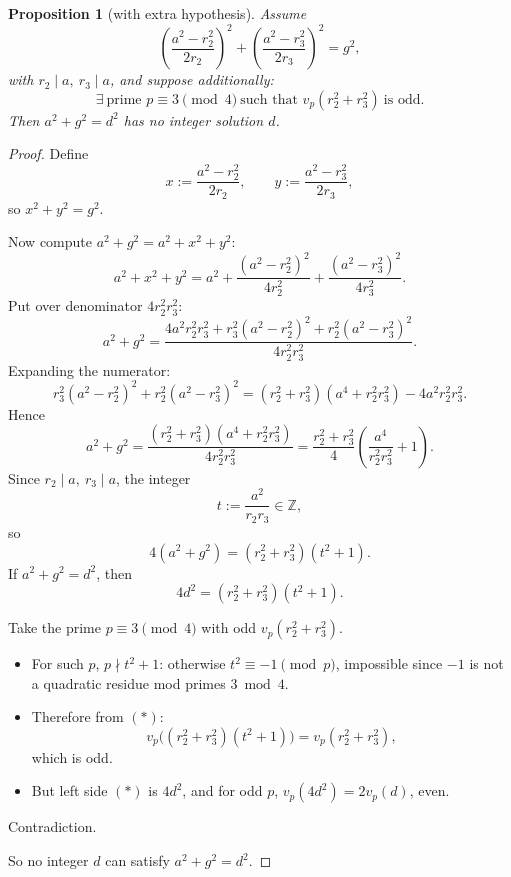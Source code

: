 \documentclass[11pt]{article}
\newtheorem{proposition}{Proposition}
\begin{document}
\begin{proposition}[with extra hypothesis]
Assume
\[
\left(\frac{a^{2}-r_{2}^{2}}{2r_{2}}\right)^{2}
+
\left(\frac{a^{2}-r_{3}^{2}}{2r_{3}}\right)^{2}
=
g^{2},
\]
with \(r_2\mid a,\ r_3\mid a\), and suppose additionally:
\[
\exists\ \text{prime }p\equiv 3\pmod 4\ \text{such that }v_p(r_2^2+r_3^2)\ \text{is odd}.
\]
Then \(a^2+g^2=d^2\) has no integer solution \(d\).
\end{proposition}

\begin{proof}
Define
\[
x:=\frac{a^2-r_2^2}{2r_2},\qquad
y:=\frac{a^2-r_3^2}{2r_3},
\]
so \(x^2+y^2=g^2\).

Now compute \(a^2+g^2=a^2+x^2+y^2\):
\[
a^2+x^2+y^2
=
a^2+\frac{(a^2-r_2^2)^2}{4r_2^2}+\frac{(a^2-r_3^2)^2}{4r_3^2}.
\]
Put over denominator \(4r_2^2r_3^2\):
\[
a^2+g^2
=
\frac{
4a^2r_2^2r_3^2+r_3^2(a^2-r_2^2)^2+r_2^2(a^2-r_3^2)^2
}{
4r_2^2r_3^2
}.
\]
Expanding the numerator:
\[
r_3^2(a^2-r_2^2)^2+r_2^2(a^2-r_3^2)^2
=
(r_2^2+r_3^2)(a^4+r_2^2r_3^2)-4a^2r_2^2r_3^2.
\]
Hence
\[
a^2+g^2
=
\frac{(r_2^2+r_3^2)(a^4+r_2^2r_3^2)}{4r_2^2r_3^2}
=
\frac{r_2^2+r_3^2}{4}\left(\frac{a^4}{r_2^2r_3^2}+1\right).
\]
Since \(r_2\mid a,\ r_3\mid a\), the integer
\[
t:=\frac{a^2}{r_2r_3}\in\mathbb Z,
\]
so
\[
4(a^2+g^2)=(r_2^2+r_3^2)(t^2+1).
\]
If \(a^2+g^2=d^2\), then
\[
4d^2=(r_2^2+r_3^2)(t^2+1). \tag{*}
\]

Take the prime \(p\equiv 3\pmod 4\) with odd \(v_p(r_2^2+r_3^2)\).

\begin{itemize}
\item For such \(p\), \(p\nmid t^2+1\): otherwise \(t^2\equiv -1\pmod p\), impossible since \(-1\) is not a quadratic residue mod primes \(3\bmod4\).
\item Therefore from \((*)\):
\[
v_p\big((r_2^2+r_3^2)(t^2+1)\big)=v_p(r_2^2+r_3^2),
\]
which is odd.
\item But left side \((*)\) is \(4d^2\), and for odd \(p\), \(v_p(4d^2)=2v_p(d)\), even.
\end{itemize}

Contradiction.

So no integer \(d\) can satisfy \(a^2+g^2=d^2\).
\end{proof}
\end{document}
